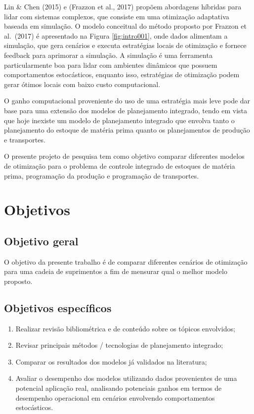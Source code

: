\documentclass[
]{book}
\providecommand{\tightlist}{%
  \setlength{\itemsep}{0pt}\setlength{\parskip}{0pt}}
\begin{document}
Lin \& Chen (2015) e (Frazzon et al., 2017) propõem abordagens híbridas para lidar com sistemas complexos, que consiste em uma otimização adaptativa baseada em simulação. O modelo conceitual do método proposto por Frazzon et al.~(2017) é apresentado na Figura \ref{fig:intro001}, onde dados alimentam a simulação, que gera cenários e executa estratégias locais de otimização e fornece feedback para aprimorar a simulação. A simulação é uma ferramenta particularmente boa para lidar com ambientes dinâmicos que possuem comportamentos estocásticos, enquanto isso, estratégias de otimização podem gerar ótimos locais com baixo custo computacional.

O ganho computacional proveniente do uso de uma estratégia mais leve pode dar base para uma extensão dos modelos de planejamento integrado, tendo em vista que hoje inexiste um modelo de planejamento integrado que envolva tanto o planejamento do estoque de matéria prima quanto os planejamentos de produção e transportes.

O presente projeto de pesquisa tem como objetivo comparar diferentes modelos de otimização para o problema de controle integrado de estoques de matéria prima, programação da produção e programação de transportes.

\hypertarget{objetivos}{%
\section{Objetivos}\label{objetivos}}

\hypertarget{objetivo-geral}{%
\subsection{Objetivo geral}\label{objetivo-geral}}

O objetivo da presente trabalho é de comparar diferentes cenários de otimização para uma cadeia de suprimentos a fim de mensurar qual o melhor modelo proposto.

\hypertarget{objetivos-especuxedficos}{%
\subsection{Objetivos específicos}\label{objetivos-especuxedficos}}

\begin{enumerate}
\def\labelenumi{\arabic{enumi}.}
\tightlist
\item
  Realizar revisão bibliométrica e de conteúdo sobre os tópicos envolvidos;
\item
  Revisar principais métodos / tecnologias de planejamento integrado;
\item
  Comparar os resultados dos modelos já validados na literatura;
\item
  Avaliar o desempenho dos modelos utilizando dados provenientes de uma potencial aplicação real, analisando potenciais ganhos em termos de desempenho operacional em cenários envolvendo comportamentos estocásticos.
\end{enumerate}
\end{document}
